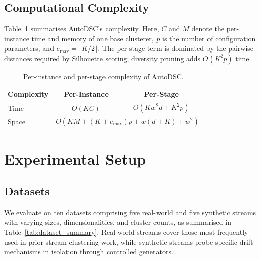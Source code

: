 \documentclass[conference]{IEEEtran}
\begin{document}
\subsection{Computational Complexity}
Table~\ref{tab:complexity} summarises AutoDSC's complexity. Here, $C$ and $M$ denote the per-instance time and memory of one base clusterer, $p$ is the number of configuration parameters, and $e_{\max}=\lfloor K/2\rfloor$. The per-stage term is dominated by the pairwise distances required by Silhouette scoring; diversity pruning adds $O(K^2p)$ time.

\begin{table}[t]
\centering
\caption{Per-instance and per-stage complexity of AutoDSC.}
\label{tab:complexity}
\begin{tabular}{lcc}
\toprule
\textbf{Complexity} & \textbf{Per-Instance} & \textbf{Per-Stage} \\
\midrule
Time  & $O(KC)$ & $O(Kw^2d + K^2p)$ \\
Space & \multicolumn{2}{c}{$O\!\left(KM+(K+e_{\max})p+w(d+K)+w^2\right)$} \\
\bottomrule
\end{tabular}
\end{table}

\section{Experimental Setup}\label{sec:setup}

\subsection{Datasets}

We evaluate on ten datasets comprising five real-world and five synthetic streams with varying sizes, dimensionalities, and cluster counts, as summarised in Table~\ref{tab:dataset_summary}. Real-world streams cover those most frequently used in prior stream clustering work, while synthetic streams probe specific drift mechanisms in isolation through controlled generators.
\end{document}
